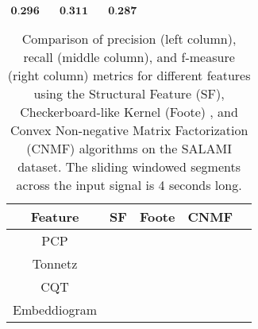 \newsavebox\cqtCNMF
\begin{lrbox}{\cqtCNMF}
   $\begin{aligned}
     \textbf{0.296} & \quad \textbf{0.311} & \quad \textbf{0.287}
    \end{aligned} $
\end{lrbox}


\begin{table}
  \centering
  \begin{adjustbox}{width=\textwidth}
  \begin{threeparttable}
    \begin{tabular}{c|c|c|c|c} 
\toprule
     \textbf{Feature} & \textbf{SF} & \textbf{Foote} & \textbf{CNMF} 
     \\ \midrule 
     PCP & \usebox{\pcpSF} & \usebox{\pcpFoote} & \usebox{\pcpCNMF} \\\hline
     Tonnetz & \usebox{\tonnetzSF} & \usebox{\tonnetzFoote} & \usebox{\tonnetzCNMF} \\\hline
     CQT & \usebox{\cqtSF} & \usebox{\cqtFoote} & \usebox{\cqtCNMF} \\\hline
     Embeddiogram & \usebox{\embeddiobSF} & \usebox{\embeddiobFoote} & \usebox{\embeddiobCNMF} \\
     \bottomrule
    \end{tabular}
    \caption[Metric comparison: audio features and segmentation algorithms]{Comparison of precision (left column), recall (middle column), and f-measure (right column) metrics for different features using the Structural Feature (SF)\cite{sf}, Checkerboard-like Kernel (Foote) \cite{Foote2000AutomaticNovelty}, and Convex Non-negative Matrix Factorization (CNMF) \cite{NietoCONVEXIDENTIFICATION} algorithms on the SALAMI dataset. The sliding windowed segments across the input signal is 4 seconds long.}\label{ta:results}
  \end{threeparttable}
  \end{adjustbox}
\end{table}


